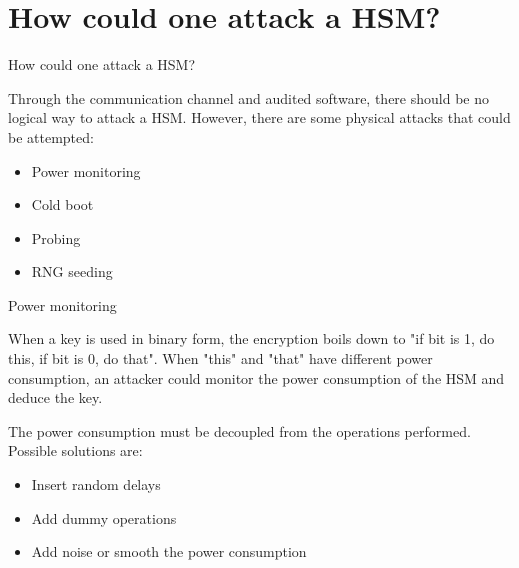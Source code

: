 \section{How could one attack a HSM?}
\begin{frame}{How could one attack a HSM?}
    \begin{wide}
        Through the communication channel and audited software, there should be no logical way to attack a HSM. However, there are some physical attacks that could be attempted:
            \begin{itemize}
                \item Power monitoring
                \item Cold boot
                \item Probing
                \item RNG seeding
            \end{itemize}
    \end{wide}
\end{frame}
\begin{frame}{Power monitoring}
    \begin{wide}
        \begin{block}[Attack]
            When a key is used in binary form, the encryption boils down to "if bit is 1, do this, if bit is 0, do that". When "this" and "that" have different power consumption, an attacker could monitor the power consumption of the HSM and deduce the key.
        \end{block}
        \begin{block}[Defense]
            The power consumption must be decoupled from the operations performed. Possible solutions are:
            \begin{itemize}
                \item Insert random delays
                \item Add dummy operations
                \item Add noise or smooth the power consumption
            \end{itemize}
        \end{block}
    \end{wide}
\end{frame}
